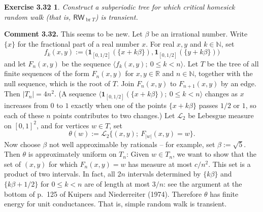 \documentclass[11pt]{article}
\newtheorem*{exercise}{Exercise 3.32}
\newcommand{\RW}{\mathsf{RW}}
\begin{document}
\begin{exercise}
Construct a subperiodic tree for which critical homesick random walk
(that is, $\RW_{\operatorname{br}T}$) is transient.
\end{exercise}

\noindent\textbf{Comment 3.32.}
This seems to be new. Let $\beta$ be an irrational number. Write $\{x\}$
for the fractional part of a real number $x$. For real $x,y$ and
$k\in\mathbb N$, set
\[
f_k(x,y):=
\bigl(\mathbf{1}_{[0,1/2]}(\{x+k\beta\}),
      \mathbf{1}_{[0,1/2]}(\{y+k\beta\})\bigr)
\]
and let $F_n(x,y)$ be the sequence
$\langle f_k(x,y);\ 0\le k<n\rangle$.
Let $T$ be the tree of all finite sequences of the form $F_n(x,y)$ for
$x,y\in\mathbb R$ and $n\in\mathbb N$, together with the null sequence,
which is the root of $T$. Join $F_n(x,y)$ to $F_{n+1}(x,y)$ by an edge.
Then $|T_n|=4n^2$.
(A sequence
$\langle\mathbf{1}_{[0,1/2]}(\{x+k\beta\});\ 0\le k<n\rangle$
changes as $x$ increases from $0$ to $1$ exactly when one of the points
$\{x+k\beta\}$ passes $1/2$ or $1$, so each of these $n$ points
contributes to two changes.)
Let $\mathcal L_2$ be Lebesgue measure on $[0,1]^2$, and for vertices
$w\in T$, set
\[
\theta(w):=\mathcal L_2
\bigl\{(x,y);\ F_{|w|}(x,y)=w\bigr\}.
\]
Now choose $\beta$ not well approximable by rationals -- for example,
set $\beta:=\sqrt5$. Then $\theta$ is approximately uniform on $T_n$:
Given $w\in T_n$, we want to show that the set of $(x,y)$ for which
$F_n(x,y)=w$ has measure at most $c/n^2$. This set is a product of two
intervals. In fact, all $2n$ intervals determined by $\{k\beta\}$ and
$\{k\beta+1/2\}$ for $0\le k<n$ are of length at most $3/n$: see the
argument at the bottom of p.~125 of Kuipers and Niederreiter (1974).
Therefore $\theta$ has finite energy for unit conductances. That is,
simple random walk is transient.
\end{document}
